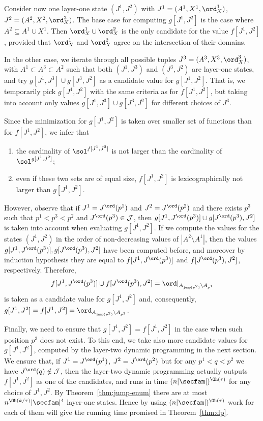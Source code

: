 Consider now one layer-one state $(J^1,J^2)$ with 
$J^1 = (A^1,X^1,\ord_X^1)$, $J^2 = (A^2,X^2,\ord_X^2)$.
The base case for computing $g[J^1,J^2]$ is the case where $A^2 \subseteq A^1 \cup X^1$.
Then $\ord_X^1 \cup \ord_X^2$ is the only candidate for the value $f[J^1,J^2]$, provided that $\ord_X^1$ and $\ord_X^2$ agree on the intersection of their domains.

In the other case, we iterate through all possible tuples
$J^3 = (A^3,X^3,\ord_X^3)$, with $A^1 \subset A^3 \subset A^2$
such that both $(J^1,J^3)$ and $(J^3,J^2)$ are layer-one states,
and try $g[J^1,J^3] \cup g[J^3,J^2]$ as a candidate value for $g[J^1,J^2]$.
That is, we temporarily
pick $g[J^1,J^2]$ with the same criteria as for $f[J^1,J^2]$, but taking into
account only values $g[J^1,J^3] \cup g[J^3,J^2]$ for different choices of $J^3$.

Since the minimization for $g[J^1,J^2]$ is taken over smaller set of functions
than for $f[J^1,J^2]$, we infer that
\begin{enumerate}
\item the cardinality of $\sol^{f[J^1,J^2]}$ is not larger than the cardinality of $\sol^{g[J^1,J^2]}$;
\item even if these two sets are of equal size, $f[J^1,J^2]$ is lexicographically
not larger than $g[J^1,J^2]$.
\end{enumerate}
However, observe that if $J^1 = J^\ord(p^1)$ and $J^2 = J^\ord(p^2)$
and there exists $p^3$ such that $p^1 < p^3 < p^2$ and $J^\ord(p^3) \in \jumpfam$,
    then $g[J^1,J^\ord(p^3)]\cup g[J^\ord(p^3),J^2]$ is taken into account when evaluating $g[J^1,J^2]$. If we compute the values for the states $(J^1,J^2)$ in the order of non-decreasing values of $|A^2\setminus A^1|$, then the values $g[J^1,J^\ord(p^3)], g[J^\ord(p^3),J^2]$ have been computed before, and moreover by induction hypothesis they are equal to $f[J^1,J^\ord(p^3)]$ and $f[J^\ord(p^3),J^2]$, respectively. Therefore,
$$f[J^1,J^\ord(p^3)] \cup f[J^\ord(p^3),J^2] = \ord|_{\secp{\jump{p^2}} \setminus \secp{p^1}}$$
is taken as a candidate value for $g[J^1,J^2]$ and, consequently, $g[J^1,J^2] = f[J^1,J^2] = \ord_{\secp{\jump{p^2}} \setminus \secp{p^1}}$.

Finally, we need to ensure that $g[J^1,J^2] = f[J^1,J^2]$ in the case
when such position $p^3$ does not exist. To this end, we take also more
candidate values for $g[J^1,J^2]$, computed by the layer-two dynamic programming
in the next section. We ensure that, if $J^1 = J^\ord(p^1)$,
$J^2 = J^\ord(p^2)$ but for any $p^1 < q < p^2$ we have $J^\ord(q) \notin \jumpfam$,
then the layer-two dynamic programming actually outputs $f[J^1,J^2]$ as one of the candidates,
     and runs in time $(n|\secfam|)^{\Oh(\tau)}$ for any choice of $J^1,J^2$. By Theorem~\ref{thm:jump-enum} there are at most $n^{\Oh(k/\tau)}|\secfam|^4$ layer-one states. Hence by using $(n|\secfam|)^{\Oh(\tau)}$ work for each of them will give the running time promised in Theorem~\ref{thm:dp}.

